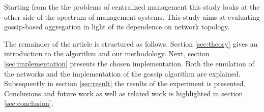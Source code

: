 Starting from the the problems of centralized management this study looks at the other side of the spectrum of management systems. This study aims at evaluating gossip-based aggregation in light of its dependence on network topology.

The remainder of the article is structured as follows. Section \ref{sec:theory} gives an introduction to the algorithm and our methodology. Next, section \ref{sec:implementation} presents the chosen implementation. Both the emulation of the networks and the implementation of the gossip algorithm are explained. Subsequently in section \ref{sec:result} the results of the experiment is presented. Conclusions and future work as well as related work is highlighted in section \ref{sec:conclusion}.
